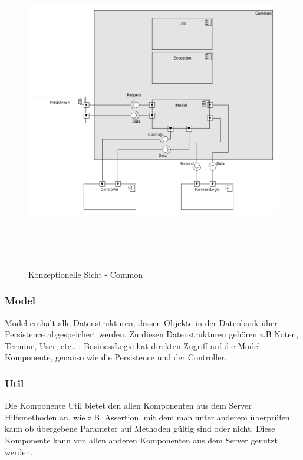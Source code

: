 {\begin{figure}[ht]
	\centering
  \includegraphics[width=\textwidth,height=14cm,keepaspectratio]{../UMLDiagramme/common}
	\caption{Konzeptionelle Sicht - Common}
	\label{fig2}
\end{figure}

\newpage
\subsubsection{Model}
Model enthält alle Datenstrukturen, dessen Objekte in der Datenbank über Persistence abgespeichert werden. Zu diesen Datenstrukturen gehören z.B Noten, Termine, User, etc.. .
BusinessLogic hat direkten Zugriff auf die Model-Komponente, genauso wie die Persistence und der Controller.

\subsubsection{Util}
{Die Komponente Util bietet den allen Komponenten aus dem Server Hilfsmethoden an, wie z.B. Assertion, mit dem man unter anderem überprüfen kann ob übergebene Parameter auf Methoden gültig sind oder nicht. Diese Komponente kann von allen anderen Komponenten aus dem Server genutzt werden.
}

}
